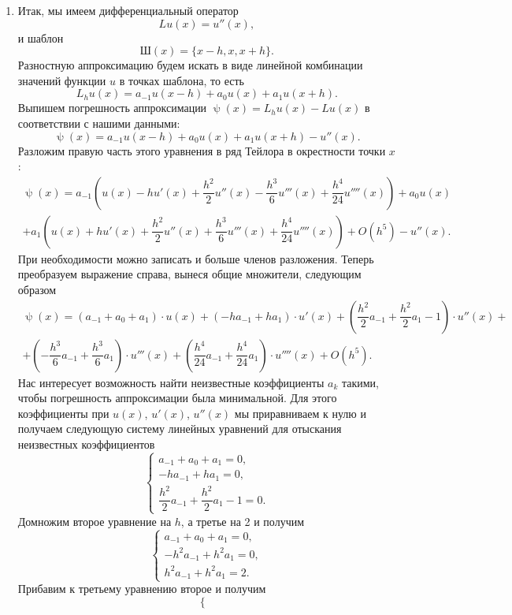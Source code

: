 \documentclass[a4paper, 12pt]{article}
\renewcommand{\psi}{\uppsi}
\begin{document}
\begin{enumerate}
		\newpage
		\item 
		\hypertarget{t2}{}
		Итак, мы имеем дифференциальный оператор $$Lu(x) = u''(x),$$ и шаблон $$\text{Ш}(x) = \{x-h, x, x+h\}.$$ Разностную аппроксимацию будем искать в виде линейной комбинации значений функции $u$ в точках шаблона, то есть $$L_h u(x) = a_{-1} u(x-h) + a_0 u(x) + a_1 u(x+h).$$ Выпишем погрешность аппроксимации $\psi(x) = L_h u(x) - L u(x)$ в соответствии с нашими данными: $$\psi(x) = a_{-1} u(x-h) + a_0 u(x) + a_1 u(x+h) - u''(x).$$
		Разложим правую часть этого уравнения в ряд Тейлора в окрестности точки $x$:
		\begin{multline*}
			\psi(x) =  a_{-1} \left(u(x) - h u'(x) + \dfrac{h^2}{2}u''(x) - \dfrac{h^3}{6}u'''(x) + \dfrac{h^4}{24}u''''(x)\right) +a_0 u(x)\\+ a_1 \left(u(x) + h u'(x) + \dfrac{h^2}{2}u''(x) + \dfrac{h^3}{6}u'''(x) + \dfrac{h^4}{24}u''''(x)\right) + O(h^5) - u''(x) .
		\end{multline*}
		При необходимости можно записать и больше членов разложения. Теперь преобразуем выражение справа, вынеся общие множители, следующим образом
		\begin{multline*}
			\psi(x) = (a_{-1} + a_0 + a_1)\cdot u(x) + (-ha_{-1} + ha_1)\cdot  u'(x) + \left(\dfrac{h^2}{2}a_{-1} + \dfrac{h^2}{2}a_1 - 1\right)\cdot u''(x) +\\+ \left(-\dfrac{h^3}{6}a_{-1} +\dfrac{h^3}{6}a_1\right)\cdot u'''(x) + \left(\dfrac{h^4}{24}a_{-1} +\dfrac{h^4}{24}a_1\right)\cdot u''''(x) +O(h^5).
		\end{multline*}
		Нас интересует возможность найти неизвестные коэффициенты $a_k$ такими, чтобы погрешность аппроксимации была минимальной. Для этого коэффициенты при $u(x)$, $u'(x)$, $u''(x)$ мы приравниваем к нулю и получаем следующую систему линейных уравнений для отыскания неизвестных коэффициентов 
		$$\begin{cases}
			a_{-1} + a_0 + a_1= 0,\\
			-ha_{-1} + ha_1= 0,\\
			\dfrac{h^2}{2}a_{-1} + \dfrac{h^2}{2}a_1 - 1= 0.
		\end{cases}$$
		Домножим второе уравнение на $h$, а третье на 2 и получим
		$$\begin{cases}
			a_{-1} + a_0 + a_1= 0,\\
			-h^2 a_{-1}+ h^2 a_1= 0,\\
			h^2 a_{-1} + h^2a_1 = 2.
		\end{cases}$$
		Прибавим к третьему уравнению второе и получим
		$$\begin{cases}

\end{cases}$$
\end{enumerate}
\end{document}
